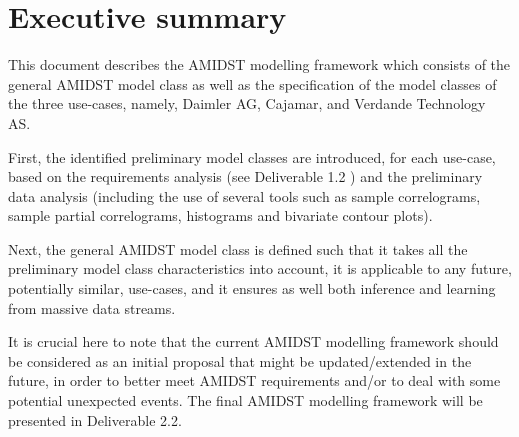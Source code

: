 \section{Executive summary}\label{section:executiveSummary}

This document describes the AMIDST modelling framework which consists of the general AMIDST model class as well as the specification of the model classes of the three use-cases, namely, Daimler AG, Cajamar, and Verdande Technology AS.

First, the identified preliminary model classes are introduced, for each use-case, based on the requirements analysis (see Deliverable 1.2 \cite{Fer14b}) and the preliminary data analysis (including the use of several tools such as sample correlograms, sample partial correlograms, histograms and bivariate contour plots).

Next, the general AMIDST model class is defined such that it takes all the preliminary model class characteristics into account, it is applicable to any future, potentially similar, use-cases, and it ensures as well both inference and learning from massive data streams.

It is crucial here to note that the current AMIDST modelling framework should be considered as an initial proposal that might be updated/extended in the future, in order to better meet AMIDST requirements and/or to deal with some potential unexpected events. The final AMIDST modelling framework will be presented in Deliverable 2.2.

